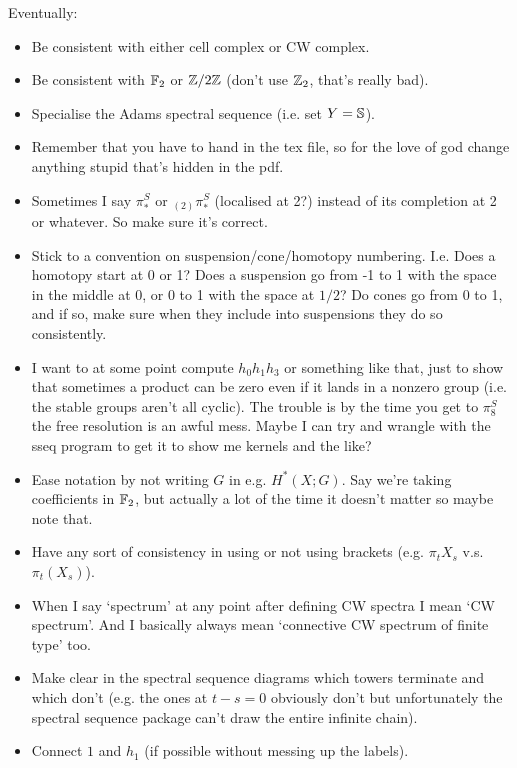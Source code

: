 \documentclass{MetricNotes2023}
\def\bb{\ensuremath\mathbb}
\def\inte{\ensuremath\mathbb{Z}}
\begin{document}
Eventually:

\begin{itemize}
\item Be consistent with either cell complex or CW complex.

\item Be consistent with \(\bb{F}_2\)  or \(\inte/2\inte\) (don't use \(\inte_2\), that's really bad).

\item Specialise the Adams spectral sequence (i.e. set \(Y=\bb{S}\)).

\item Remember that you have to hand in the tex file, so for the love of god change anything stupid that's hidden in the pdf.

\item Sometimes I say \(\pi_*^S\) or \(\text{}_{(2)}\pi_*^S\) (localised at 2?) instead of its completion at 2 or whatever. So make sure it's correct.

\item Stick to a convention on suspension/cone/homotopy numbering. I.e. Does a homotopy start at 0 or 1? Does a suspension go from -1 to 1 with the space in the middle at 0, or 0 to 1 with the space at \(1/2\)? Do cones go from 0 to 1, and if so, make sure when they include into suspensions they do so consistently. 

\item I want to at some point compute \(h_0h_1h_3\) or something like that, just to show that sometimes a product can be zero even if it lands in a nonzero group (i.e. the stable groups aren't all cyclic). The trouble is by the time you get to \(\pi_8^S\) the free resolution is an awful mess. Maybe I can try and wrangle with the sseq program to get it to show me kernels and the like?

\item Ease notation by not writing \(G\) in e.g. \(H^*(X;G)\). Say we're taking coefficients in \(\bb{F}_2\), but actually a lot of the time it doesn't matter so maybe note that.

\item Have any sort of consistency in using or not using brackets (e.g. \(\pi_t X_s\) v.s. \(\pi_t(X_s)\)). 

\item When I say `spectrum' at any point after defining CW spectra I mean `CW spectrum'. And I basically always mean `connective CW spectrum of finite type' too. 

\item Make clear in the spectral sequence diagrams which towers terminate and which don't (e.g. the ones at \(t-s=0\) obviously don't but unfortunately the spectral sequence package can't draw the entire infinite chain).

\item Connect \(1\) and \(h_1\) (if possible without messing up the labels). 

\end{itemize}
\end{document}

